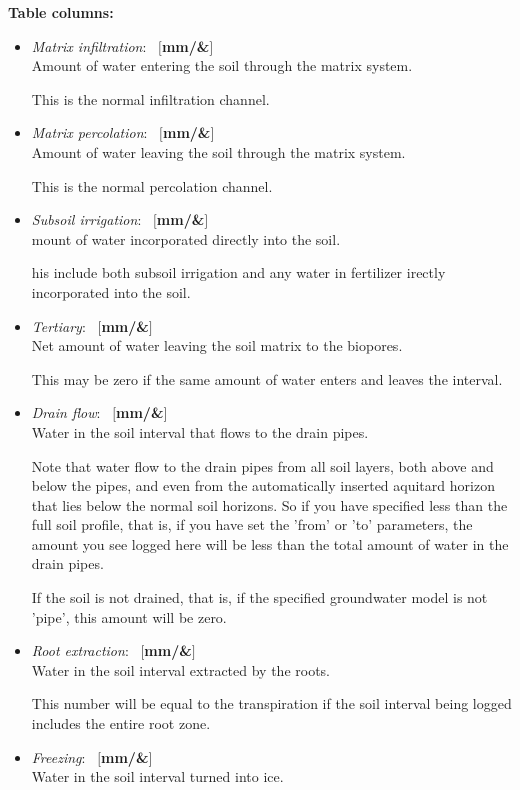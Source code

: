 \documentclass[a4paper]{article}
\begin{document}
\textbf{Table columns:}\begin{itemize}
\item \textit{Matrix infiltration}: ~$[$\textbf{mm/\&}$]$\\
Amount of water entering the soil through the matrix system.

This is the normal infiltration channel.
\item \textit{Matrix percolation}: ~$[$\textbf{mm/\&}$]$\\
Amount of water leaving the soil through the matrix system.

This is the normal percolation channel.
\item \textit{Subsoil irrigation}: ~$[$\textbf{mm/\&}$]$\\
mount of water incorporated directly into the soil.

his include both subsoil irrigation and any water in fertilizer
irectly incorporated into the soil.
\item \textit{Tertiary}: ~$[$\textbf{mm/\&}$]$\\
Net amount of water leaving the soil matrix to the biopores.

This may be zero if the same amount of water enters and leaves the interval.
\item \textit{Drain flow}: ~$[$\textbf{mm/\&}$]$\\
Water in the soil interval that flows to the drain pipes.

Note that water flow to the drain pipes from all soil layers, both
above and below the pipes, and even from the automatically inserted
aquitard horizon that lies below the normal soil horizons.  So if you
have specified less than the full soil profile, that is, if you have
set the 'from' or 'to' parameters, the amount you see logged here will
be less than the total amount of water in the drain pipes.

If the soil is not drained, that is, if the specified groundwater model
is not 'pipe', this amount will be zero.
\item \textit{Root extraction}: ~$[$\textbf{mm/\&}$]$\\
Water in the soil interval extracted by the roots.

This number will be equal to the transpiration if the soil interval
being logged includes the entire root zone.
\item \textit{Freezing}: ~$[$\textbf{mm/\&}$]$\\
Water in the soil interval turned into ice.


\end{itemize}
\end{document}

